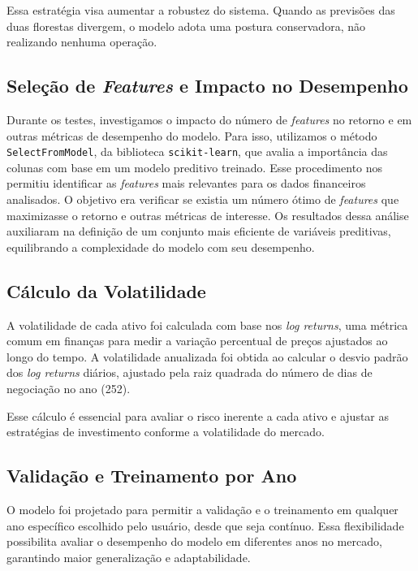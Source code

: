 \documentclass{article}
\begin{document}
Essa estratégia visa aumentar a robustez do sistema. Quando as previsões das duas florestas divergem, o modelo adota uma postura conservadora, não realizando nenhuma operação.

\subsection{Seleção de \textit{Features} e Impacto no Desempenho}

Durante os testes, investigamos o impacto do número de \textit{features} no retorno e em outras métricas de desempenho do modelo. Para isso, utilizamos o método \texttt{SelectFromModel}, da biblioteca \texttt{scikit-learn}, que avalia a importância das colunas com base em um modelo preditivo treinado. Esse procedimento nos permitiu identificar as \textit{features} mais relevantes para os dados financeiros analisados. O objetivo era verificar se existia um número ótimo de \textit{features} que maximizasse o retorno e outras métricas de interesse. Os resultados dessa análise auxiliaram na definição de um conjunto mais eficiente de variáveis preditivas, equilibrando a complexidade do modelo com seu desempenho.

\subsection{Cálculo da Volatilidade}

A volatilidade de cada ativo foi calculada com base nos \textit{log returns}, uma métrica comum em finanças para medir a variação percentual de preços ajustados ao longo do tempo. A volatilidade anualizada foi obtida ao calcular o desvio padrão dos \textit{log returns} diários, ajustado pela raiz quadrada do número de dias de negociação no ano (252).

Esse cálculo é essencial para avaliar o risco inerente a cada ativo e ajustar as estratégias de investimento conforme a volatilidade do mercado.

\subsection{Validação e Treinamento por Ano}

O modelo foi projetado para permitir a validação e o treinamento em qualquer ano específico escolhido pelo usuário, desde que seja contínuo. Essa flexibilidade possibilita avaliar o desempenho do modelo em diferentes anos no mercado, garantindo maior generalização e adaptabilidade.
\end{document}

